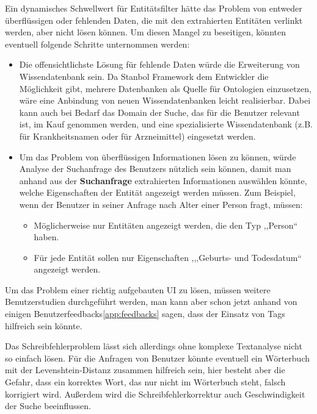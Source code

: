 Ein dynamisches Schwellwert für Entitätsfilter hätte das Problem von entweder überflüssigen oder fehlenden Daten, die mit den extrahierten Entitäten verlinkt werden, aber nicht lösen können. Um diesen Mangel zu beseitigen, könnten eventuell folgende Schritte unternommen werden:
\begin{itemize}
\item Die offensichtlichste Lösung für fehlende Daten würde die Erweiterung von Wissendatenbank sein. Da Stanbol Framework dem Entwickler die Möglichkeit gibt, mehrere Datenbanken als Quelle für Ontologien einzusetzen, wäre eine Anbindung von neuen Wissendatenbanken leicht realisierbar. Dabei kann auch bei Bedarf das Domain der Suche, das für die Benutzer relevant ist, im Kauf genommen werden, und eine spezialisierte Wissendatenbank (z.B. für Krankheitsnamen oder für Arzneimittel) eingesetzt werden.
\item Um das Problem von überflüssigen Informationen lösen zu können, würde Analyse der Suchanfrage des Benutzers nützlich sein können, damit man anhand aus der \textbf{Suchanfrage} extrahierten Informationen auswählen könnte, welche Eigenschaften der Entität angezeigt werden müssen. Zum Beispiel, wenn der Benutzer in seiner Anfrage nach Alter einer Person fragt, müssen:
\begin{itemize}
\item Möglicherweise nur Entitäten angezeigt werden, die den Typ ,,Person`` haben.
\item Für jede Entität sollen nur Eigenschaften ,,,Geburts- und Todesdatum`` angezeigt werden.
\end{itemize}
\end{itemize}

Um das Problem einer richtig aufgebauten UI zu lösen, müssen weitere Benutzerstudien durchgeführt werden, man kann aber schon jetzt anhand von einigen Benutzerfeedbacks\ref{app:feedbacks} sagen, dass der Einsatz von Tags hilfreich sein könnte.

Das Schreibfehlerproblem lässt sich allerdings ohne komplexe Textanalyse nicht so einfach lösen. Für die Anfragen von Benutzer könnte eventuell ein Wörterbuch mit der Levenshtein-Distanz zusammen hilfreich sein, hier besteht aber die Gefahr, dass ein korrektes Wort, das nur nicht im Wörterbuch steht, falsch korrigiert wird. Außerdem wird die Schreibfehlerkorrektur auch Geschwindigkeit der Suche beeinflussen.
